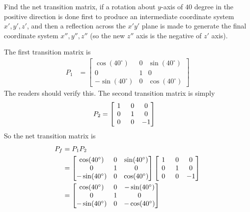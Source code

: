 \begin{exmp}
Find the net transition matrix, if a rotation about $y$-axis of $40$ degree in the positive direction is done first to produce an intermediate coordinate system $x', y', z'$, and then a reflection across the $x'y'$ plane is made to generate the final coordinate system $x'', y'', z''$ (so the new $z''$ axis is the negative of $z'$ axis).
\end{exmp}
\begin{solution}
The first transition matrix is
\begin{align*}
P_1
&= 
\begin{bmatrix}
\cos(40^\circ) & 0 & \sin(40^\circ) \\
0 & 1 & 0 \\
-\sin(40^\circ) & 0 & \cos(40^\circ)
\end{bmatrix}
\end{align*}
The readers should verify this. The second transition matrix is simply
\begin{align*}
P_2
&= 
\left[\begin{array}{@{\,}wc{10pt}wc{10pt}wc{10pt}@{\,}}
1 & 0 & 0 \\
0 & 1 & 0 \\
0 & 0 & -1
\end{array}\right]    
\end{align*}
So the net transition matrix is
\begin{align*}
P_f &= P_1P_2 \\
&= 
\begin{bmatrix}
\cos(40^\circ) & 0 & \sin(40^\circ) \\
0 & 1 & 0 \\
-\sin(40^\circ) & 0 & \cos(40^\circ)
\end{bmatrix}
\left[\begin{array}{@{\,}wc{10pt}wc{10pt}wc{10pt}@{\,}}
1 & 0 & 0 \\
0 & 1 & 0 \\
0 & 0 & -1
\end{array}\right] \\
&= 
\begin{bmatrix}
\cos(40^\circ) & 0 & -\sin(40^\circ) \\
0 & 1 & 0 \\
-\sin(40^\circ) & 0 & -\cos(40^\circ)
\end{bmatrix}
\end{align*}
\end{solution}
